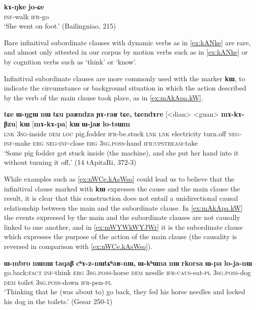 \documentclass[oldfontcommands,oneside,a4paper,11pt]{article}
\newcommand{\ipa}[1]{{\phon\textbf{#1}}}
\begin{document}
\begin{exe}
\ex \label{ex:kANke}
\gll
\ipa{kɤ-ŋke} \ipa{jo-ɕe} \\
\textsc{inf}-walk \textsc{ifr}-go \\
\glt `She went on foot.' (Bailingniao, 215)
\end{exe} 

Bare infinitival subordinate clauses with dynamic verbs as in \ref{ex:kANke} are rare, and almost only attested in our corpus by motion verbs such as in \ref{ex:kANke} or by cognition verbs such as `think' or `know'.

 Infinitival subordinate clauses are more commonly used with the marker \ipa{kɯ}, to indicate the circumstance or background situation in which the action described by the verb of the main clause took place, as in \ref{ex:mAkApa.kW}. 

\begin{exe}
\ex \label{ex:mAkApa.kW}
\gll
\ipa{tɕe}   	\ipa{ɯ-ŋgɯ}   	\ipa{nɯ} \ipa{tɕu}   	\ipa{paʁndza}   	\ipa{ɲɤ-raʁ}   	\ipa{tɕe,}   	\ipa{tɕendɤre}   	[<dian>   	<guan>   	\ipa{mɤ-kɤ-βzu}] 	\ipa{\textbf{kɯ}}   	[\ipa{mɤ-kɤ-pa}]   	\ipa{\textbf{kɯ}}   	\ipa{ɯ-jaʁ}   	\ipa{lo-tsɯm}   \\
\textsc{lnk} \textsc{3sg}-inside \textsc{dem} \textsc{loc} pig.fodder \textsc{ifr}-be.stuck \textsc{lnk}
\textsc{lnk} electricity turn.off \textsc{neg-inf}-make \textsc{erg}  \textsc{neg-inf}-close \textsc{erg}  \textsc{3sg.poss}-hand \textsc{ifr:upstream}-take \\
\glt `Some pig fodder got stuck inside (the machine), and she put her hand into it without turning it off,' (14 tApitaRi, 372-3)
\end{exe} 

 While  examples such as \ref{ex:nWCe.kAsWso} could lead us to believe that the infinitival clause marked with \ipa{kɯ}  expresses the cause and the main clause the result, it is clear that this construction does not entail a unidirectional causal relationship between the main and the subordinate clause. In \ref{ex:mAkApa.kW} the events expressed by the main and the subordinate clauses are not causally linked to one another, and in  \ref{ex:mWYWkWYJWr} it is the subordinate clause which expresses the purpose of the action of the main clause (the causality is reversed in comparison with \ref{ex:nWCe.kAsWso}).

  \begin{exe}
\ex \label{ex:nWCe.kAsWso}
\gll 
[\ipa{nɯɕe}  	\ipa{kɤ-sɯso}]  	\ipa{kɯ,}  	\ipa{ɯ-mbro}  	\ipa{nɯnɯ}  	\ipa{taqaβ}  	\ipa{cʰɤ-z-nɯtɕʰaʁ-nɯ,}  	\ipa{ɯ-kʰɯna}  	\ipa{nɯ}  	\ipa{rkorsa}  	\ipa{ɯ-pa}  	\ipa{lo-ja-nɯ}  \\
go.back:\textsc{fact} \textsc{inf}-think \textsc{erg} \textsc{3sg.poss}-horse \textsc{dem} needle \textsc{ifr-caus}-eat-\textsc{pl}   \textsc{3sg.poss}-dog \textsc{dem} toilet \textsc{3sg.poss}-down \textsc{ifr}-pen-\textsc{pl} \\
\glt `Thinking that he (was about to) go back, they fed his horse needles and locked his dog in the toilets.' (Gesar 250-1)
 \end{exe} 
 
\end{document}

